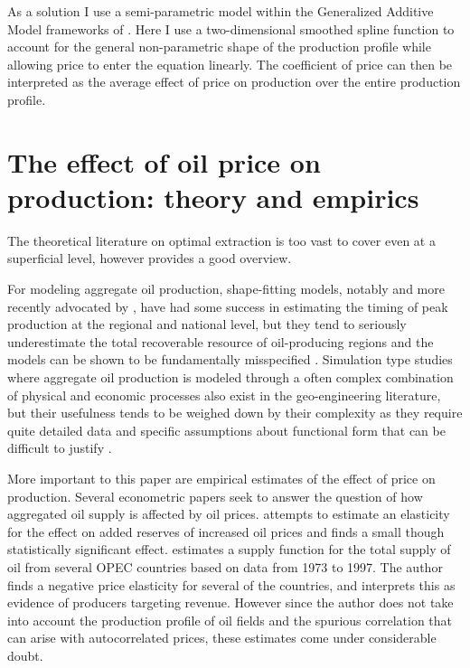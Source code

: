 \documentclass[12pt]{article}
\begin{document}
As a solution I use a semi-parametric model within the Generalized Additive Model frameworks of \cite{hastie_generalized_1990}.  Here I use a two-dimensional smoothed spline function to account for the general non-parametric shape of the production profile while allowing price to enter the equation linearly.  The coefficient of price can then be interpreted as the average effect of price on production over the entire production profile.

\section{The effect of oil price on production: theory and empirics}
The theoretical literature on optimal extraction is too vast to cover even at a superficial level, however \citet{krautkraemer_nonrenewable_1998} provides a good overview.

For modeling aggregate oil production, shape-fitting models, notably \citet{hubbert_energy_1962} and more recently advocated by \citet{deffeyes_hubberts_2001}, have had some success in estimating the timing of peak production at the regional and national level, but they tend to seriously underestimate the total recoverable resource of oil-producing regions and the models can be shown to be fundamentally misspecified \citep{boyce_prediction_2013}.   Simulation type studies where aggregate oil production is modeled through a often complex combination of physical and economic processes also exist in the geo-engineering literature, but their usefulness tends to be weighed down by their complexity as they require quite detailed data and specific assumptions about functional form that can be difficult to justify \citet{brandt_review_2010}.

More important to this paper are empirical estimates of the effect of price on production. Several econometric papers seek to answer the question of how aggregated oil supply is affected by oil prices.  \citet{farzin_impact_2001} attempts to estimate an elasticity for the effect on added reserves of increased oil prices and finds a small though statistically significant effect.  \citet{ramcharran_oil_2002} estimates a supply function for the total supply of oil from several OPEC countries based on data from 1973 to 1997.  The author finds a negative price elasticity for several of the countries, and interprets this as evidence of producers targeting revenue.  However since the author does not take into account the production profile of oil fields and the spurious correlation that can arise with autocorrelated prices, these estimates come under considerable doubt.  
\end{document}
